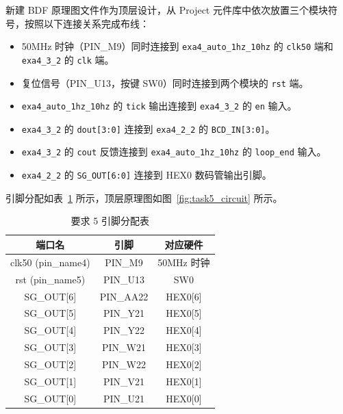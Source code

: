 \documentclass[12pt]{ctexart}
\begin{document}
新建 BDF 原理图文件作为顶层设计，从 Project 元件库中依次放置三个模块符号，按照以下连接关系完成布线：

\begin{itemize}
    \item 50MHz 时钟（PIN\_M9）同时连接到 \texttt{exa4\_auto\_1hz\_10hz} 的 \texttt{clk50} 端和 \texttt{exa4\_3\_2} 的 \texttt{clk} 端。
    \item 复位信号（PIN\_U13，按键 SW0）同时连接到两个模块的 \texttt{rst} 端。
    \item \texttt{exa4\_auto\_1hz\_10hz} 的 \texttt{tick} 输出连接到 \texttt{exa4\_3\_2} 的 \texttt{en} 输入。
    \item \texttt{exa4\_3\_2} 的 \texttt{dout[3:0]} 连接到 \texttt{exa4\_2\_2} 的 \texttt{BCD\_IN[3:0]}。
    \item \texttt{exa4\_3\_2} 的 \texttt{cout} 反馈连接到 \texttt{exa4\_auto\_1hz\_10hz} 的 \texttt{loop\_end} 输入。
    \item \texttt{exa4\_2\_2} 的 \texttt{SG\_OUT[6:0]} 连接到 HEX0 数码管输出引脚。
\end{itemize}

引脚分配如表~\ref{tab:task5_pins} 所示，顶层原理图如图~\ref{fig:task5_circuit} 所示。

\begin{table}[H]
    \centering
    \caption{要求 5 引脚分配表}
    \label{tab:task5_pins}
    \begin{tabular}{ccc}
        \toprule
        \textbf{端口名} & \textbf{引脚} & \textbf{对应硬件} \\
        \midrule
        clk50 (pin\_name4) & PIN\_M9  & 50MHz 时钟 \\
        rst (pin\_name5)   & PIN\_U13 & SW0 \\
        SG\_OUT[6]         & PIN\_AA22 & HEX0[6] \\
        SG\_OUT[5]         & PIN\_Y21  & HEX0[5] \\
        SG\_OUT[4]         & PIN\_Y22  & HEX0[4] \\
        SG\_OUT[3]         & PIN\_W21  & HEX0[3] \\
        SG\_OUT[2]         & PIN\_W22  & HEX0[2] \\
        SG\_OUT[1]         & PIN\_V21  & HEX0[1] \\
        SG\_OUT[0]         & PIN\_U21  & HEX0[0] \\
        \bottomrule
    \end{tabular}
\end{table}
\end{document}
